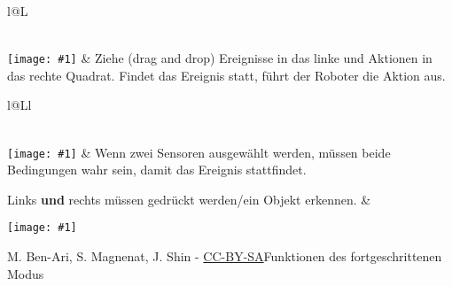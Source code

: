 \documentclass[a4paper]{article}
\newcommand*{\blk}[1]{\raisebox{-40pt}%
{\texttt{[image: \#1]}}}
\newcommand*{\blkbig}[1]{\raisebox{-50pt}%
{\texttt{[image: \#1]}}}
\begin{document}
\vfill

\begin{tabularx}{\textwidth}{l@{\hspace{.7cm}}L}

 \\[.4cm]


\blkbig{event-action-pair-empty} & Ziehe (drag and drop) Ereignisse in das linke und Aktionen in das rechte Quadrat. Findet das Ereignis statt, führt der Roboter die Aktion aus.
\\

\end{tabularx}

\vfill

\begin{tabularx}{\textwidth}{l@{\hspace{.7cm}}Ll}

 \\[.4cm]

\blk{sensor-and-button} & Wenn zwei Sensoren ausgewählt werden, müssen beide Bedingungen wahr sein, damit das Ereignis stattfindet.

Links \textbf{und} rechts müssen gedrückt werden/ein Objekt erkennen. &

\blk{sensor-and-prox}\\

\end{tabularx}

\vfill

{\normalsize M. Ben-Ari, S. Magnenat, J. Shin - \href{http://creativecommons.org/licenses/by-sa/3.0/}{CC-BY-SA}}\hfill\colorbox{advancedmode}{Funktionen des fortgeschrittenen Modus}
\end{document}
